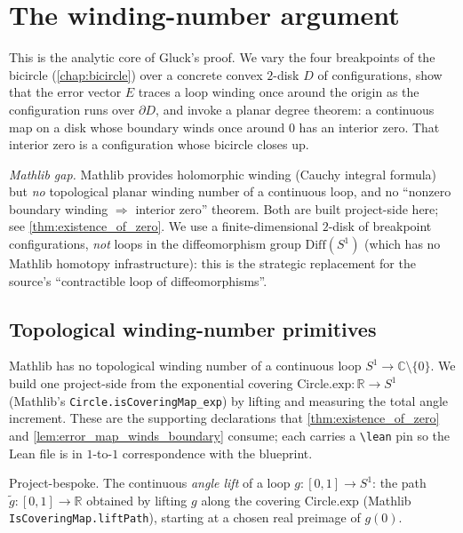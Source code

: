 \chapter{The winding-number argument}
\label{chap:winding}


This is the analytic core of Gluck's proof. We vary the four breakpoints of the
bicircle (\cref{chap:bicircle}) over a concrete convex $2$-disk $D$ of
configurations, show that the error vector $E$ traces a loop winding once around
the origin as the configuration runs over $\partial D$, and invoke a planar
degree theorem: a continuous map on a disk whose boundary winds once around $0$
has an interior zero. That interior zero is a configuration whose bicircle closes
up.

\medskip

\noindent\emph{Mathlib gap.} Mathlib provides holomorphic winding (Cauchy
integral formula) but \emph{no} topological planar winding number of a continuous
loop, and no ``nonzero boundary winding $\Rightarrow$ interior zero'' theorem.
Both are built project-side here; see \cref{thm:existence_of_zero}. We use a
finite-dimensional $2$-disk of breakpoint configurations, \emph{not} loops in the
diffeomorphism group $\mathrm{Diff}(S^1)$ (which has no Mathlib homotopy
infrastructure): this is the strategic replacement for the source's
``contractible loop of diffeomorphisms''.

\section{Topological winding-number primitives}

Mathlib has no topological winding number of a continuous loop $S^1 \to
\mathbb{C}\setminus\{0\}$. We build one project-side from the exponential covering
$\mathrm{Circle.exp} : \mathbb{R} \to S^1$ (Mathlib's
\texttt{Circle.isCoveringMap\_exp}) by lifting and measuring the total angle
increment. These are the supporting declarations that
\cref{thm:existence_of_zero} and \cref{lem:error_map_winds_boundary} consume; each
carries a \texttt{\textbackslash lean} pin so the Lean file is in $1$-to-$1$ correspondence with the
blueprint.

\begin{definition}

  \label{def:angle_lift}
  Project-bespoke. The continuous \emph{angle lift} of a loop $g : [0,1] \to S^1$:
  the path $\widetilde g : [0,1] \to \mathbb{R}$ obtained by lifting $g$ along the
  covering $\mathrm{Circle.exp}$ (Mathlib \texttt{IsCoveringMap.liftPath}),
  starting at a chosen real preimage of $g(0)$.
\end{definition}

